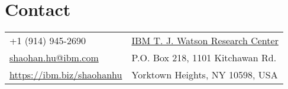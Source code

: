 
\section{\sc Contact}
\vspace{.01in}
\begin{tabular}{@{}p{3.6in}p{4in}}
+1 (914) 945-2690  & {\href{http://research.ibm.com/labs/watson/index.shtml}{IBM T. J. Watson Research Center}} \\
{\href{mailto:shaohan.hu@ibm.com}{shaohan.hu@ibm.com}} & {P.O. Box 218, 1101 Kitchawan Rd.} \\
{\url{https://ibm.biz/shaohanhu}} & Yorktown Heights, NY 10598, USA \\
\end{tabular}
